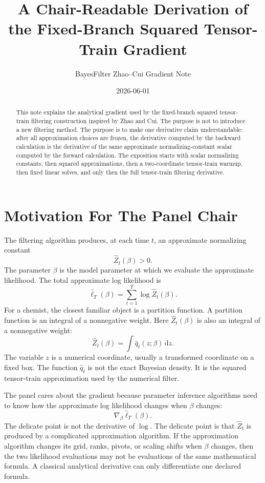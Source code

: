 \documentclass[11pt]{article}
\title{A Chair-Readable Derivation of the Fixed-Branch Squared Tensor-Train Gradient}
\author{BayesFilter Zhao--Cui Gradient Note}
\date{2026-06-01}
\theoremstyle{remark}
\newcommand{\dd}{\,\mathrm d}
\newcommand{\widehatell}{\widehat\ell}
\begin{document}
\maketitle

\begin{abstract}
This note explains the analytical gradient used by the fixed-branch squared
tensor-train filtering construction inspired by Zhao and Cui.  The purpose is
not to introduce a new filtering method.  The purpose is to make one derivative
claim understandable: after all approximation choices are frozen, the derivative
computed by the backward calculation is the derivative of the same approximate
normalizing-constant scalar computed by the forward calculation.  The exposition
starts with scalar normalizing constants, then squared approximations, then a
two-coordinate tensor-train warmup, then fixed linear solves, and only then the
full tensor-train filtering derivative.
\end{abstract}

\tableofcontents

\section{Motivation For The Panel Chair}

The filtering algorithm produces, at each time \(t\), an approximate
normalizing constant
\[
    \widehat Z_t(\beta)>0.
    \tag{1}
\]
The parameter \(\beta\) is the model parameter at which we evaluate the
approximate likelihood.  The total approximate log likelihood is
\[
    \widehatell_T(\beta)
    =
    \sum_{t=1}^{T}\log \widehat Z_t(\beta).
    \tag{2}
\]
For a chemist, the closest familiar object is a partition function.  A
partition function is an integral of a nonnegative weight.  Here
\(\widehat Z_t(\beta)\) is also an integral of a nonnegative weight:
\[
    \widehat Z_t(\beta)
    =
    \int \widehat q_t(z;\beta)\dd z.
    \tag{3}
\]
The variable \(z\) is a numerical coordinate, usually a transformed coordinate
on a fixed box.  The function \(\widehat q_t\) is not the exact Bayesian
density.  It is the squared tensor-train approximation used by the numerical
filter.

The panel cares about the gradient because parameter inference algorithms need
to know how the approximate log likelihood changes when \(\beta\) changes:
\[
    \nabla_\beta \widehatell_T(\beta).
    \tag{4}
\]
The delicate point is not the derivative of \(\log\).  The delicate point is
that \(\widehat Z_t\) is produced by a complicated approximation algorithm.  If
the approximation algorithm changes its grid, ranks, pivots, or scaling shifts
when \(\beta\) changes, then the two likelihood evaluations may not be
evaluations of the same mathematical formula.  A classical analytical
derivative can only differentiate one declared formula.
\end{document}
